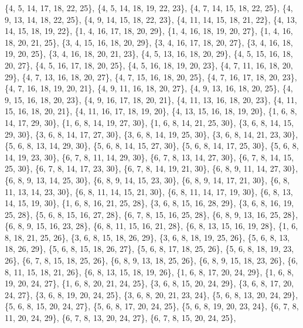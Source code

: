 \documentclass[11pt,a4paper]{article}
\begin{document}
{\{4, 5, 14, 17, 18, 22, 25\}, \{4, 5, 14, 18, 19, 22, 23\}, \{4, 7, 14, 15, 18, 22, 25\}, \{4, 9, 13, 14, 18, 22, 25\}, \{4, 9, 14, 15, 18, 22, 23\},
\{4, 11, 14, 15, 18, 21, 22\}, \{4, 13, 14, 15, 18, 19, 22\}, \{1, 4, 16, 17, 18, 20, 29\}, \{1, 4, 16, 18, 19, 20, 27\}, \{1, 4, 16, 18, 20, 21, 25\},
\{3, 4, 15, 16, 18, 20, 29\}, \{3, 4, 16, 17, 18, 20, 27\}, \{3, 4, 16, 18, 19, 20, 25\}, \{3, 4, 16, 18, 20, 21, 23\}, \{4, 5, 13, 16, 18, 20, 29\},
\{4, 5, 15, 16, 18, 20, 27\}, \{4, 5, 16, 17, 18, 20, 25\}, \{4, 5, 16, 18, 19, 20, 23\}, \{4, 7, 11, 16, 18, 20, 29\}, \{4, 7, 13, 16, 18, 20, 27\},
\{4, 7, 15, 16, 18, 20, 25\}, \{4, 7, 16, 17, 18, 20, 23\}, \{4, 7, 16, 18, 19, 20, 21\}, \{4, 9, 11, 16, 18, 20, 27\}, \{4, 9, 13, 16, 18, 20, 25\},
\{4, 9, 15, 16, 18, 20, 23\}, \{4, 9, 16, 17, 18, 20, 21\}, \{4, 11, 13, 16, 18, 20, 23\}, \{4, 11, 15, 16, 18, 20, 21\}, \{4, 11, 16, 17, 18, 19, 20\},
\{4, 13, 15, 16, 18, 19, 20\}, \{1, 6, 8, 14, 17, 29, 30\}, \{1, 6, 8, 14, 19, 27, 30\}, \{1, 6, 8, 14, 21, 25, 30\}, \{3, 6, 8, 14, 15, 29, 30\},
\{3, 6, 8, 14, 17, 27, 30\}, \{3, 6, 8, 14, 19, 25, 30\}, \{3, 6, 8, 14, 21, 23, 30\}, \{5, 6, 8, 13, 14, 29, 30\}, \{5, 6, 8, 14, 15, 27, 30\},
\{5, 6, 8, 14, 17, 25, 30\}, \{5, 6, 8, 14, 19, 23, 30\}, \{6, 7, 8, 11, 14, 29, 30\}, \{6, 7, 8, 13, 14, 27, 30\}, \{6, 7, 8, 14, 15, 25, 30\},
\{6, 7, 8, 14, 17, 23, 30\}, \{6, 7, 8, 14, 19, 21, 30\}, \{6, 8, 9, 11, 14, 27, 30\}, \{6, 8, 9, 13, 14, 25, 30\}, \{6, 8, 9, 14, 15, 23, 30\},
\{6, 8, 9, 14, 17, 21, 30\}, \{6, 8, 11, 13, 14, 23, 30\}, \{6, 8, 11, 14, 15, 21, 30\}, \{6, 8, 11, 14, 17, 19, 30\}, \{6, 8, 13, 14, 15, 19, 30\},
\{1, 6, 8, 16, 21, 25, 28\}, \{3, 6, 8, 15, 16, 28, 29\}, \{3, 6, 8, 16, 19, 25, 28\}, \{5, 6, 8, 15, 16, 27, 28\}, \{6, 7, 8, 15, 16, 25, 28\},
\{6, 8, 9, 13, 16, 25, 28\}, \{6, 8, 9, 15, 16, 23, 28\}, \{6, 8, 11, 15, 16, 21, 28\}, \{6, 8, 13, 15, 16, 19, 28\}, \{1, 6, 8, 18, 21, 25, 26\},
\{3, 6, 8, 15, 18, 26, 29\}, \{3, 6, 8, 18, 19, 25, 26\}, \{5, 6, 8, 13, 18, 26, 29\}, \{5, 6, 8, 15, 18, 26, 27\}, \{5, 6, 8, 17, 18, 25, 26\},
\{5, 6, 8, 18, 19, 23, 26\}, \{6, 7, 8, 15, 18, 25, 26\}, \{6, 8, 9, 13, 18, 25, 26\}, \{6, 8, 9, 15, 18, 23, 26\}, \{6, 8, 11, 15, 18, 21, 26\},
\{6, 8, 13, 15, 18, 19, 26\}, \{1, 6, 8, 17, 20, 24, 29\}, \{1, 6, 8, 19, 20, 24, 27\}, \{1, 6, 8, 20, 21, 24, 25\}, \{3, 6, 8, 15, 20, 24, 29\},
\{3, 6, 8, 17, 20, 24, 27\}, \{3, 6, 8, 19, 20, 24, 25\}, \{3, 6, 8, 20, 21, 23, 24\}, \{5, 6, 8, 13, 20, 24, 29\}, \{5, 6, 8, 15, 20, 24, 27\},
\{5, 6, 8, 17, 20, 24, 25\}, \{5, 6, 8, 19, 20, 23, 24\}, \{6, 7, 8, 11, 20, 24, 29\}, \{6, 7, 8, 13, 20, 24, 27\}, \{6, 7, 8, 15, 20, 24, 25\},
}
\end{document}
